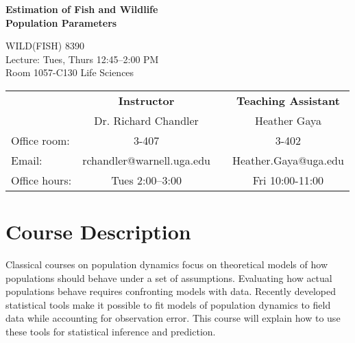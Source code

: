 \documentclass[12pt]{article}
\begin{document}

{\centering

{\Large \bf \sc
  Estimation of Fish and Wildlife \\ Population Parameters \\
}
\vspace{6pt}

WILD(FISH) 8390  \\
Lecture: Tues, Thurs 12:45--2:00 PM \\
Room 1057-C130 Life Sciences \\


\normalsize

\vspace{12pt}

\begin{tabular}[h!]{lccc}
                     & \textbf{Instructor}       & \hspace{0.01cm} & \textbf{Teaching Assistant} \\
                     & Dr. Richard Chandler      &                 & Heather Gaya                \\
Office room:         & 3-407                     &                 & 3-402                       \\
Email:               & rchandler@warnell.uga.edu &                 & Heather.Gaya@uga.edu        \\
Office hours:        & Tues 2:00--3:00           &                 & Fri 10:00-11:00              \\
\end{tabular}


}



\normalsize


\vspace{-4mm}
\section*{\normalsize Course Description}
\vspace{-4mm}
Classical courses on population dynamics focus on theoretical models 
of how populations should behave under a set of assumptions.
Evaluating how actual populations behave requires confronting models
with data. Recently developed statistical tools make it possible to fit
models of population dynamics to field data while accounting for
observation error. This course will explain how to use these tools for
statistical inference and prediction.  
\end{document}
